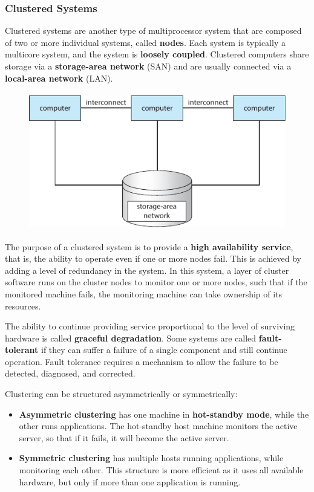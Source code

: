 \documentclass{article}
\begin{document}
\subsubsection{Clustered Systems}
Clustered systems are another type of multiprocessor system that are
composed of two or more individual systems, called \textbf{nodes}. Each
system is typically a multicore system, and the system is
\textbf{loosely coupled}. Clustered computers share storage via a
\textbf{storage-area network} (SAN) and are usually connected via a
\textbf{local-area network} (LAN).
\begin{figure}[H]
    \centering
    \includegraphics[height = 6cm]{figures/clustered_system.pdf}
\end{figure}
\begin{tcolorboxlarge}[title={High-Availability Service}, parbox=false]
    The purpose of a clustered system is to provide a \textbf{high
        availability service}, that is,	the ability to operate even if one
    or more nodes fail.	This is achieved by adding a level of redundancy
    in the system. In this system, a layer of cluster software runs on
    the cluster nodes to monitor one or more nodes, such that if the
    monitored machine fails, the monitoring machine can take ownership
    of its resources.

    The ability to continue providing service proportional to the level
    of surviving hardware is called \textbf{graceful degradation}. Some
    systems are called \textbf{fault-tolerant} if they can suffer a
    failure of a single component and still continue operation. Fault
    tolerance requires a mechanism to allow the failure to be detected,
    diagnosed, and corrected.

    Clustering can be structured asymmetrically or symmetrically:
    \begin{itemize}
        \item \textbf{Asymmetric clustering} has one
              machine in \textbf{hot-standby mode}, while the other runs
              applications. The hot-standby host machine monitors the
              active server, so that if it fails, it will become the
              active server.
        \item \textbf{Symmetric clustering} has multiple hosts running
              applications, while monitoring each other. This structure
              is more efficient as it uses all available hardware, but
              only if more than one application is running.
    \end{itemize}
\end{tcolorboxlarge}
\end{document}
